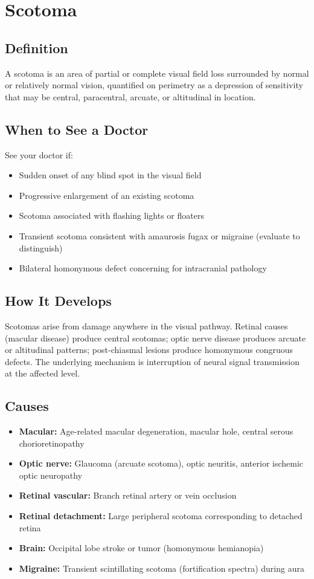 \chapter{Scotoma}

\section*{Definition}
A scotoma is an area of partial or complete visual field loss surrounded by normal or relatively normal vision, quantified on perimetry as a depression of sensitivity that may be central, paracentral, arcuate, or altitudinal in location.

\section*{When to See a Doctor}
See your doctor if:
\begin{itemize}
  \item Sudden onset of any blind spot in the visual field
  \item Progressive enlargement of an existing scotoma
  \item Scotoma associated with flashing lights or floaters
  \item Transient scotoma consistent with amaurosis fugax or migraine (evaluate to distinguish)
  \item Bilateral homonymous defect concerning for intracranial pathology
\end{itemize}

\section*{How It Develops}
Scotomas arise from damage anywhere in the visual pathway. Retinal causes (macular disease) produce central scotomas; optic nerve disease produces arcuate or altitudinal patterns; post-chiasmal lesions produce homonymous congruous defects. The underlying mechanism is interruption of neural signal transmission at the affected level.

\section*{Causes}
\begin{itemize}
  \item \textbf{Macular:} Age-related macular degeneration, macular hole, central serous chorioretinopathy
  \item \textbf{Optic nerve:} Glaucoma (arcuate scotoma), optic neuritis, anterior ischemic optic neuropathy
  \item \textbf{Retinal vascular:} Branch retinal artery or vein occlusion
  \item \textbf{Retinal detachment:} Large peripheral scotoma corresponding to detached retina
  \item \textbf{Brain:} Occipital lobe stroke or tumor (homonymous hemianopia)
  \item \textbf{Migraine:} Transient scintillating scotoma (fortification spectra) during aura
\end{itemize}

